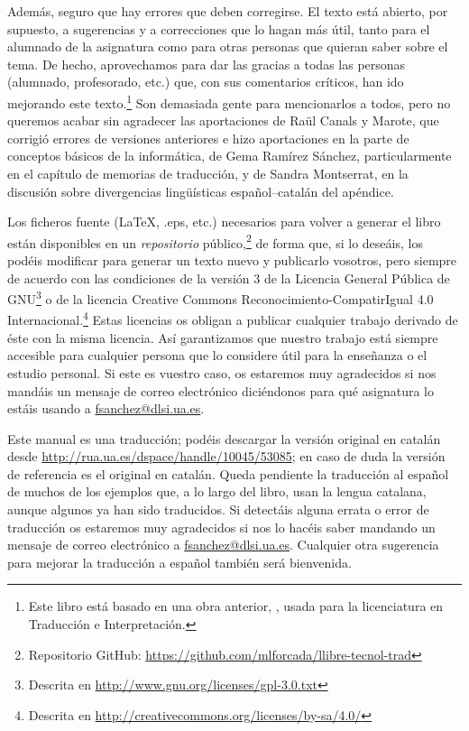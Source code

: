 Además, seguro que hay errores que deben corregirse. El texto está abierto, por supuesto, a sugerencias y a correcciones que lo hagan más útil, tanto para el alumnado de la asignatura como para otras personas que quieran saber sobre el tema. De hecho, aprovechamos para dar las gracias a todas las personas (alumnado, profesorado, etc.) que, con sus comentarios críticos, han ido mejorando este texto.\footnote{Este libro está basado en una obra anterior, \protect\citep{forcada09b}, usada para la licenciatura en Traducción e Interpretación.} Son demasiada gente para mencionarlos a todos, pero no queremos acabar sin agradecer las aportaciones de Raül Canals y Marote, que corrigió errores de versiones anteriores e hizo aportaciones en la parte de conceptos básicos de la informática, de Gema Ramírez Sánchez, particularmente en el capítulo de memorias de traducción, y de Sandra Montserrat, en la discusión sobre divergencias lingüísticas español--catalán del apéndice. 

Los ficheros fuente (\LaTeX, .eps, etc.) necesarios para volver a
generar el libro están disponibles en un \emph{repositorio}
público,\footnote{Repositorio GitHub:
  \url{https://github.com/mlforcada/llibre-tecnol-trad}} de forma que,
si lo deseáis, los podéis modificar para generar un texto nuevo y
publicarlo vosotros, pero siempre de acuerdo con las condiciones de la
versión 3 de la Licencia General Pública de GNU\footnote{Descrita en
  \url{http://www.gnu.org/licenses/gpl-3.0.txt}} o de la licencia
Creative Commons Reconocimiento-CompatirIgual 4.0
Internacional.\footnote{Descrita en
  \url{http://creativecommons.org/licenses/by-sa/4.0/}} Estas
licencias os obligan a publicar cualquier trabajo derivado de éste con
la misma licencia. Así garantizamos que nuestro trabajo está siempre
accesible para cualquier persona que lo considere útil para la
enseñanza o el estudio personal. Si este es vuestro caso, os estaremos
muy agradecidos si nos mandáis un mensaje de correo electrónico
diciéndonos para qué asignatura lo estáis usando a
\url{fsanchez@dlsi.ua.es}. 


Este manual es una traducción; podéis descargar la versión original en
catalán desde \url{http://rua.ua.es/dspace/handle/10045/53085}; en
caso de duda la versión de referencia es el original en catalán. Queda
pendiente la traducción al español de muchos de los ejemplos que, a lo
largo del libro, usan la lengua catalana, aunque algunos ya han sido
traducidos. Si detectáis alguna errata o error de traducción os
estaremos muy agradecidos si nos lo hacéis saber mandando un mensaje
de correo electrónico a \url{fsanchez@dlsi.ua.es}. Cualquier otra
sugerencia para mejorar la traducción a español también será
bienvenida.




